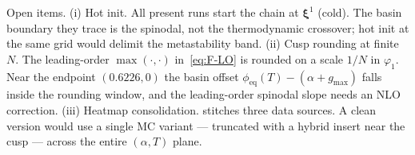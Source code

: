\documentclass[11pt]{article}
\newcommand{\bxi}{\boldsymbol{\xi}}
\newcommand{\phieq}{\phi_{\mathrm{eq}}}
\newcommand{\gmax}{g_{\max}}
\begin{document}
Open items.
(i) Hot init.  All present runs start the chain at $\bxi^1$ (cold).  The
basin boundary they trace is the spinodal, not the thermodynamic
crossover; hot init at the same grid would delimit the metastability
band.
(ii) Cusp rounding at finite $N$.  The leading-order $\max(\cdot,\cdot)$
in~\eqref{eq:F-LO} is rounded on a scale $1/N$ in $\varphi_1$.  Near the
endpoint $(0.6226, 0)$ the basin offset $\phieq(T) - (\alpha + \gmax)$
falls inside the rounding window, and the leading-order spinodal slope
needs an NLO correction.
(iii) Heatmap consolidation.   stitches three data
sources.  A clean version would use a single MC variant — truncated with
a hybrid insert near the cusp — across the entire $(\alpha, T)$ plane.



\end{document}

